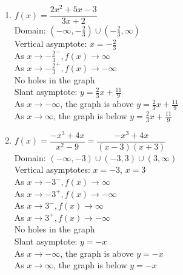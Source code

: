 \begin{multicols}{2}
\begin{enumerate}
\setcounter{enumi}{\value{HW}}

\item $f(x) = \dfrac{2x^{2} + 5x - 3}{3x + 2}$\\
Domain: $\left(-\infty, -\frac{2}{3}\right) \cup \left(-\frac{2}{3}, \infty\right)$\\
Vertical asymptote: $x = -\frac{2}{3}$\\
As $x \rightarrow -\frac{2}{3}^{-}, f(x) \rightarrow \infty$\\
As $x \rightarrow -\frac{2}{3}^{+}, f(x) \rightarrow -\infty$\\
No holes in the graph \\
Slant asymptote:  $y = \frac{2}{3}x + \frac{11}{9}$ \\
As $x \rightarrow  -\infty$, the graph is above \small $y = \frac{2}{3}x + \frac{11}{9}$\\
\normalsize As $x \rightarrow \infty$, the graph is below \small $y = \frac{2}{3}x + \frac{11}{9}$ \normalsize \\

\vfill

\columnbreak

\item $f(x) = \dfrac{-x^{3} + 4x}{x^{2} - 9} = \dfrac{-x^{3} + 4x}{(x-3)(x+3)} $\\
Domain: $(-\infty, -3) \cup (-3, 3) \cup (3, \infty)$\\
Vertical asymptotes: $x = -3$, $x=3$\\
As $x \rightarrow -3^{-}, f(x) \rightarrow \infty$\\
As $x \rightarrow -3^{+}, f(x) \rightarrow -\infty$\\
As $x \rightarrow 3^{-}, f(x) \rightarrow \infty$\\
As $x \rightarrow 3^{+}, f(x) \rightarrow -\infty$\\
No holes in the graph \\
Slant asymptote: $y=-x$ \\
As $x \rightarrow -\infty$, the graph is above $y=-x$\\
As $x \rightarrow \infty$, the graph is below $y=-x$\\


\setcounter{HW}{\value{enumi}}
\end{enumerate}
\end{multicols}

